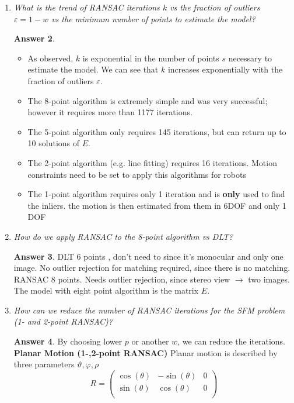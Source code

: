 \documentclass[a4paper,12 pt]{article}
\theoremstyle{definition}
\theoremstyle{remark}
\theoremstyle{definition}
\theoremstyle{definition}
\theoremstyle{definition}
\theoremstyle{definition}
\theoremstyle{remark}
\theoremstyle{remark}
\theoremstyle{definition}
\theoremstyle{definition}
\newtheorem*{answer}{Answer}
\begin{document}
\begin{enumerate}
\begin{answer}
\end{answer}
\item \textit{What is the trend of RANSAC iterations $k$ vs the fraction of outliers $\varepsilon=1-w$ vs the minimum number of points to estimate the model? }
\begin{answer}
\
\begin{itemize}
\item As observed, $k$ is exponential in the number of points $s$ necessary to estimate the model. We can see that $k$ increases exponentially with the fraction of outliers $\varepsilon$.
\item The 8-point algorithm is extremely simple and was very successful; however it requires more than 1177 iterations.
\item The 5-point algorithm only requires 145 iterations, but can return up to 10 solutions of $E$.
\item The 2-point algorithm (e.g. line fitting) requires 16 iterations. Motion constraints need to be set to apply this algorithms for robots
\item The 1-point algorithm requires only 1 iteration and is \textbf{only} used to find the inliers. the motion is then estimated from them in 6DOF and only 1 DOF 
\end{itemize}
\end{answer}
\item \textit{How do we apply RANSAC to the 8-point algorithm vs DLT? }
\begin{answer}
DLT 6 points , don't need to since it's monocular and only one image. No outlier rejection for matching required, since there is no matching.\\
RANSAC 8 points. Needs outlier rejection, since stereo view $\rightarrow$ two images. The model with eight point algorithm is the matrix $E$.
\end{answer}
\item \textit{How can we reduce the number of RANSAC iterations
for the SFM problem (1- and 2-point RANSAC)?}
\begin{answer}
By choosing lower $p$ or another $w$, we can reduce the iterations. \\
\textbf{Planar Motion (1-,2-point RANSAC)}
Planar motion is described by three parameters $\vartheta,\varphi,\rho$
\begin{equation}
R=\begin{pmatrix}
\cos(\theta)&-\sin(\theta)&0\\
\sin(\theta)&\cos(\theta)&0\\

\end{pmatrix}
\end{equation}
\end{answer}
\end{enumerate}
\end{document}
